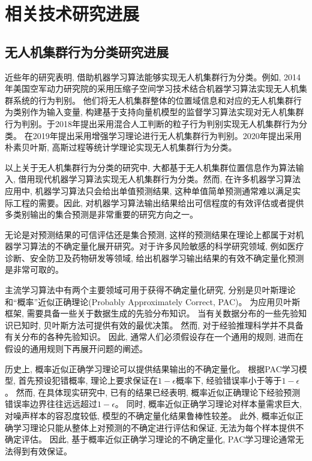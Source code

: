 \section{相关技术研究进展}
\subsection{无人机集群行为分类研究进展}
近些年的研究表明, 借助机器学习算法能够实现无人机集群行为分类。例如, 2014年美国空军动力研究院的\citet{Becker2014}采用压缩子空间学习技术结合机器学习算法实现无人机集群系统的行为判别。 他们将无人机集群整体的位置域信息和对应的无人机集群行为类别作为输入变量, 构建基于支持向量机模型的监督学习算法实现对无人机集群行为判别。\citet{Khan2020}于2018年提出采用混合人工判断的粒子行为判别实现无人机集群行为分类。 \citet{Hahn2019}在2019年提出采用增强学习理论进行无人机集群行为判别。2020年\citet{Lan2020}提出采用朴素贝叶斯, 高斯过程等统计学理论实现无人机集群行为分类。 

以上关于无人机集群行为分类的研究中, 大都基于无人机集群位置信息作为算法输入, 借用现代机器学习算法实现无人机集群行为分类。然而, 在许多机器学习算法应用中, 机器学习算法只会给出单值预测结果, 这种单值简单预测通常难以满足实际工程的需要。因此, 对机器学习算法输出结果给出可信程度的有效评估或者提供多类别输出的集合预测是非常重要的研究方向之一。

无论是对预测结果的可信评估还是集合预测, 这样的预测结果在理论上都属于对机器学习算法的不确定量化展开研究。对于许多风险敏感的科学研究领域, 例如医疗诊断\citep{Nouretdinov2013}、安全防卫\citep{Vineeth2014}及药物研发\citep{Janette2022}等领域, 给出机器学习输出结果的有效不确定量化预测是非常可取的。

主流学习算法中有两个主要领域可用于获得不确定量化研究, 分别是贝叶斯理论和“概率”近似正确理论(Probably Approximately Correct, PAC)\citep{Valiant1984}。 为应用贝叶斯框架, 需要具备一些关于数据生成的先验分布知识。 当有关数据分布的一些先验知识已知时, 贝叶斯方法可提供有效的最优决策。 然而, 对于经验推理科学\citep{Vapnik2006}并不具备有关分布的各种先验知识。 因此, 通常人们必须假设存在一个通用的规则, 进而在假设的通用规则下再展开问题的阐述。

历史上, 概率近似正确学习理论可以提供结果输出的不确定量化。 根据PAC学习模型, 首先预设犯错概率, 理论上要求保证在$1-\epsilon$概率下, 经验错误率小于等于$1-\epsilon$。 然而, 在具体现实研究中, 已有的结果已经表明, 概率近似正确理论下经验预测错误率边界往往远远超过$1-\epsilon$\citep{vovk2005algorithmic}。 同时, 概率近似正确学习理论对样本量需求巨大, 对噪声样本的容忍度较低, 模型的不确定量化结果鲁棒性较差\citep{vovk2005algorithmic}。 此外, 概率近似正确学习理论只能从整体上对预测的不确定进行评估和保证, 无法为每个样本提供不确定评估\citep{vovk2005algorithmic}。 因此, 基于概率近似正确学习理论的不确定量化, PAC学习理论通常无法得到有效保证\citep{Papadopoulos2008}。

